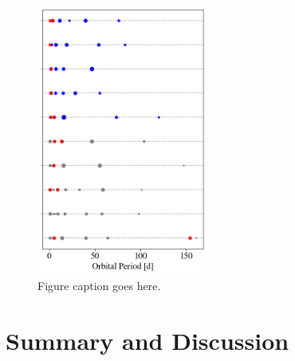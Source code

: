\begin{figure}
\begin{center}
    \includegraphics[width=0.5\textwidth]{figures/stip/architectures_syn_comp.png}
    \caption{Figure caption goes here.\label{fig:architectures_syn_comp}}
\end{center}
\end{figure}

\section{Summary and Discussion} \label{sec:discuss}



